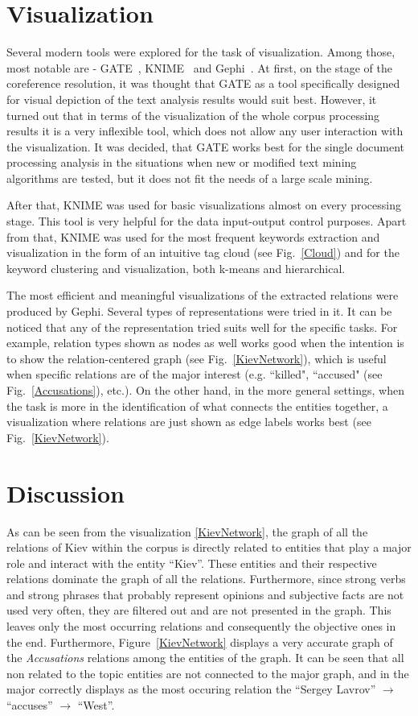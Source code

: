 \documentclass[]{article}
\begin{document}
\section{Visualization}
%
Several modern tools were explored for the task of visualization. Among those, most notable are - GATE~\cite{gate}, KNIME~\cite{knime} and Gephi~\cite{gephi}. At first, on the stage of the coreference resolution, it was thought that GATE as a tool specifically designed for visual depiction of the text analysis results would suit best. However, it turned out that in terms of the visualization of the whole corpus processing results it is a very inflexible tool, which does not allow any user interaction with the visualization. It was decided, that GATE works best for the single document processing analysis in the situations when new or modified text mining algorithms are tested, but it does not fit the needs of a large scale mining.

After that, KNIME was used for basic visualizations almost on every processing stage. This tool is very helpful for the data input-output control purposes. Apart from that, KNIME was used for the most frequent keywords extraction and visualization in the form of an intuitive tag cloud (see Fig.~\ref{Cloud}) and for the keyword clustering and visualization, both k-means and hierarchical.

The most efficient and meaningful visualizations of the extracted relations were produced by Gephi. Several types of representations were tried in it. It can be noticed that any of the representation tried suits well for the specific tasks. For example, relation types shown as nodes as well works good when the intention is to show the relation-centered graph (see Fig.~\ref{KievNetwork}), which is useful when specific relations are of the major interest (e.g. ``killed", ``accused" (see Fig.~\ref{Accusations}), etc.). On the other hand, in the more general settings, when the task is more in the identification of what connects the entities together, a visualization where relations are just shown as edge labels works best (see Fig.~\ref{KievNetwork}).

% 
\section{Discussion}
%
As can be seen from the visualization \ref{KievNetwork}, the graph of all the relations of Kiev within the corpus is directly related to entities that play a major role and interact with the entity ``Kiev''. These entities and their respective relations dominate the graph of all the relations. Furthermore, since strong verbs and strong phrases that probably represent opinions and subjective facts are not used very often, they are filtered out and are not presented in the graph. This leaves only the most occurring relations and consequently the objective ones in the end. Furthermore, Figure~\ref{KievNetwork} displays a very accurate graph of the \textit{Accusations} relations among the entities of the graph. It can be seen that all non related to the topic entities are not connected to the major graph, and in the major correctly displays as the most occuring relation the ``Sergey Lavrov'' $\to$ ``accuses'' $\to$  ``West''.
\end{document}
